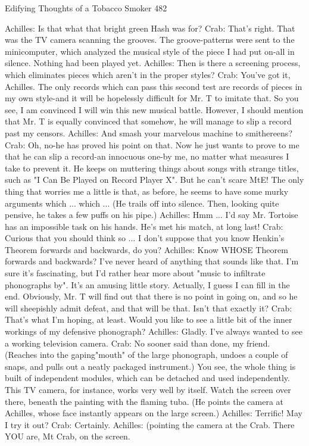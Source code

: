 {Edifying Thoughts of a Tobacco Smoker                                                   482

Achilles: Is that what that bright green Hash was for?
Crab: That's right. That was the TV camera scanning the grooves. The groove-patterns
  were sent to the minicomputer, which analyzed the musical style of the piece I had put
  on-all in silence. Nothing had been played yet.
Achilles: Then is there a screening process, which eliminates pieces which aren't in the
  proper styles?
Crab: You've got it, Achilles. The only records which can pass this second test are
  records of pieces in my own style-and it will be hopelessly difficult for Mr. T to
  imitate that. So you see, I am convinced I will win this new musical battle. However, I
  should mention that Mr. T is equally convinced that somehow, he will manage to slip
  a record past my censors.
Achilles: And smash your marvelous machine to smithereens?
Crab: Oh, no-he has proved his point on that. Now he just wants to prove to me that he
  can slip a record-an innocuous one-by me, no matter what measures I take to prevent
  it. He keeps on muttering things about songs with strange titles, such as "I Can Be
  Played on Record Player X". But he can't scare MtE! The only thing that worries me a
  little is that, as before, he seems to have some murky arguments which ... which ... (He
  trails off into silence. Then, looking quite pensive, he takes a few puffs on his pipe.)
Achilles: Hmm ... I'd say Mr. Tortoise has an impossible task on his hands. He's met his
  match, at long last!
Crab: Curious that you should think so ... I don't suppose that you know Henkin's
  Theorem forwards and backwards, do you?
Achilles: Know WHOSE Theorem forwards and backwards? I've never heard of anything
  that sounds like that. I'm sure it's fascinating, but I'd rather hear more about "music to
  infiltrate phonographs by". It's an amusing little story. Actually, I guess I can fill in the
  end. Obviously, Mr. T will find out that there is no point in going on, and so he will
  sheepishly admit defeat, and that will be that. Isn't that exactly it?
Crab: That's what I'm hoping, at least. Would you like to see a little bit of the inner
  workings of my defensive phonograph?
Achilles: Gladly. I've always wanted to see a working television camera.
Crab: No sooner said than done, my friend. (Reaches into the gaping"mouth" of the large
  phonograph, undoes a couple of snaps, and pulls out a neatly packaged instrument.)
  You see, the whole thing is built of independent modules, which can be detached and
  used independently. This TV camera, for instance, works very well by itself. Watch
  the screen over there, beneath the painting with the flaming tuba. (He points the
  camera at Achilles, whose face instantly appears on the large screen.)
Achilles: Terrific! May I try it out?
Crab: Certainly.
   Achilles: (pointing the camera at the Crab. There YOU are, Mt Crab, on the screen.




}
